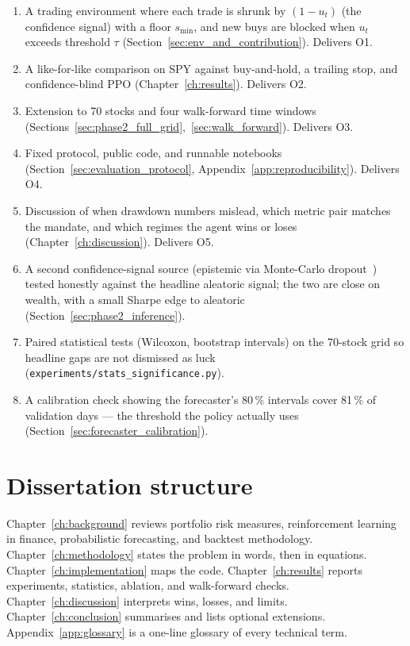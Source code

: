 \begin{enumerate}
  \item A trading environment where each trade is shrunk by $(1 - u_t)$ (the confidence signal) with a floor $s_{\min}$, and new buys are blocked when $u_t$ exceeds threshold $\tau$ (Section~\ref{sec:env_and_contribution}). Delivers O1.
  \item A like-for-like comparison on SPY against buy-and-hold, a trailing stop, and confidence-blind PPO (Chapter~\ref{ch:results}). Delivers O2.
  \item Extension to 70 stocks and four walk-forward time windows (Sections~\ref{sec:phase2_full_grid},~\ref{sec:walk_forward}). Delivers O3.
  \item Fixed protocol, public code, and runnable notebooks (Section~\ref{sec:evaluation_protocol}, Appendix~\ref{app:reproducibility}). Delivers O4.
  \item Discussion of when drawdown numbers mislead, which metric pair matches the mandate, and which regimes the agent wins or loses (Chapter~\ref{ch:discussion}). Delivers O5.
  \item A second confidence-signal source (epistemic via Monte-Carlo dropout~\parencite{gal2016dropout}) tested honestly against the headline aleatoric signal; the two are close on wealth, with a small Sharpe edge to aleatoric (Section~\ref{sec:phase2_inference}).
  \item Paired statistical tests (Wilcoxon, bootstrap intervals) on the 70-stock grid so headline gaps are not dismissed as luck (\texttt{experiments/stats\_significance.py}).
  \item A calibration check showing the forecaster's 80\,\% intervals cover 81\,\% of validation days --- the threshold the policy actually uses (Section~\ref{sec:forecaster_calibration}).
\end{enumerate}

\section{Dissertation structure}
\label{sec:dissertation_structure}

Chapter~\ref{ch:background} reviews portfolio risk measures, reinforcement learning in finance, probabilistic forecasting, and backtest methodology. Chapter~\ref{ch:methodology} states the problem in words, then in equations. Chapter~\ref{ch:implementation} maps the code. Chapter~\ref{ch:results} reports experiments, statistics, ablation, and walk-forward checks. Chapter~\ref{ch:discussion} interprets wins, losses, and limits. Chapter~\ref{ch:conclusion} summarises and lists optional extensions. Appendix~\ref{app:glossary} is a one-line glossary of every technical term.
